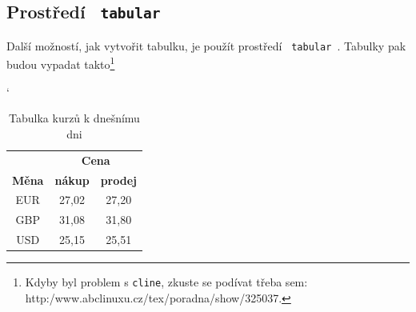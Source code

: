 \documentclass[a4paper, 11pt] {article}
\begin{document}
\subsection{Prostředí \texttt{ tabular }}
Další možností, jak vytvořit tabulku, je použít prostředí \texttt{ tabular }. Tabulky pak budou vypadat takto\footnote{Kdyby byl problem s \texttt{cline}, zkuste se podívat třeba sem: http:/www.abclinuxu.cz/tex/poradna/show/325037.}
\bigskip
\begin{table}[h]
\begin{center}
\catcode`
\begin{tabular}{|c|c|c|}
\hline
\textbf{}     & \multicolumn{2}{|c|}{\textbf{Cena}} \\ \cline{2-3} 
\textbf{Měna} & \textbf{nákup}  & \textbf{prodej}  \\ \hline
EUR           & 27,02           & 27,20            \\
GBP           & 31,08           & 31,80            \\
USD           & 25,15           & 25,51            \\ \hline
\end{tabular}
\caption{Tabulka kurzů k dnešnímu dni}
\label{t1}
\end{center}
\end{table}
\end{document}
